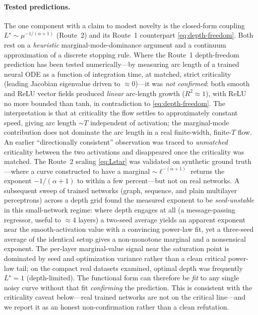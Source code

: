 \documentclass[11pt]{article}
\theoremstyle{definition}
\newcommand{\Lstar}{L^{\star}}
\begin{document}
\paragraph{Tested predictions.} The one component with a claim to modest novelty is the
closed-form coupling $\Lstar\sim\mu^{-1/(\alpha+1)}$ (Route~2) and its Route~1 counterpart
\eqref{eq:depth-freedom}. Both rest on a \emph{heuristic} marginal-mode-dominance argument
and a continuum approximation of a discrete stopping rule. Where the Route~1 depth-freedom
prediction has been tested numerically---by measuring arc length of a trained neural ODE as a
function of integration time, at matched, strict criticality (leading Jacobian eigenvalue
driven to $\approx0$)---it was \emph{not confirmed}: both smooth and ReLU vector fields
produced \emph{linear} arc-length growth ($R^2\approx1$), with ReLU no more bounded than
tanh, in contradiction to \eqref{eq:depth-freedom}. The interpretation is that at criticality
the flow settles to approximately constant speed, giving arc length $\sim T$ independent of
activation; the marginal-mode contribution does not dominate the arc length in a real
finite-width, finite-$T$ flow. An earlier ``directionally consistent'' observation was traced
to \emph{unmatched} criticality between the two activations and disappeared once the
criticality was matched. The Route~2 scaling \eqref{eq:Lstar} was validated on synthetic
ground truth---where a curve constructed to have a marginal $\sim\ell^{-(\alpha+1)}$ returns
the exponent $-1/(\alpha+1)$ to within a few percent---but not on real networks. A subsequent
sweep of trained networks (graph, sequence, and plain multilayer perceptrons) across a depth
grid found the measured exponent to be \emph{seed-unstable} in this small-network regime:
where depth engages at all (a message-passing regressor, useful to $\approx4$ layers) a
two-seed average yields an apparent exponent near the smooth-activation value with a
convincing power-law fit, yet a three-seed average of the identical setup gives a
non-monotone marginal and a nonsensical exponent. The per-layer marginal-value signal near
the saturation point is dominated by seed and optimization variance rather than a clean
critical power-law tail; on the compact real datasets examined, optimal depth was frequently
$\Lstar=1$ (depth-limited). The functional form can therefore be \emph{fit} to any single
noisy curve without that fit \emph{confirming} the prediction. This is consistent with the
criticality caveat below---real trained networks are not on the critical line---and we report
it as an honest non-confirmation rather than a clean refutation.
\end{document}
